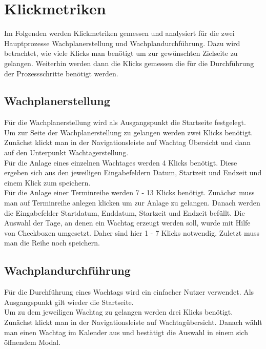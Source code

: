 \documentclass[fontsize=12pt,openright,oneside,paper=a4,BCOR=1cm]{scrbook}
\begin{document}

\section{Klickmetriken}
Im Folgenden werden Klickmetriken gemessen und analysiert für die zwei Hauptprozesse Wachplanerstellung und Wachplandurchführung. Dazu wird betrachtet, wie viele Klicks man benötigt um zur gewünschten Zielseite zu gelangen. Weiterhin werden dann die Klicks gemessen die für die Durchführung der Prozessschritte benötigt werden.

\subsection{Wachplanerstellung}
Für die Wachplanerstellung wird als Ausgangspunkt die Startseite festgelegt. \\
Um zur Seite der Wachplanerstellung zu gelangen werden zwei Klicks benötigt. Zunächst klickt man in der Navigationsleiste auf \glqq Wachtag Übersicht\grqq{} und dann auf den Unterpunkt \glqq Wachtagerstellung\grqq{}. \\
Für die Anlage eines einzelnen Wachtages werden 4 Klicks benötigt. Diese ergeben sich aus den jeweiligen Eingabefeldern \glqq Datum\grqq{}, \glqq Startzeit\grqq{} und \glqq Endzeit\grqq{} und einem Klick zum speichern. \\
Für die Anlage einer Terminreihe werden 7 - 13 Klicks benötigt. Zunächst muss man auf \glqq Terminreihe anlegen\grqq{} klicken um zur Anlage zu gelangen. Danach werden die Eingabefelder \glqq Startdatum\grqq{}, \glqq Enddatum\grqq{}, \glqq Startzeit\grqq{} und \glqq Endzeit\grqq{} befüllt. Die Auswahl der Tage, an denen ein Wachtag erzeugt werden soll, wurde mit Hilfe von Checkboxen umgesetzt. Daher sind hier 1 - 7 Klicks notwendig. Zuletzt muss man die Reihe noch speichern. \\

\subsection{Wachplandurchführung}
Für die Durchführung eines Wachtags wird ein einfacher Nutzer verwendet. Als Ausgangspunkt gilt wieder die Startseite. \\
Um zu dem jeweiligen Wachtag zu gelangen werden drei Klicks benötigt. Zunächst klickt man in der Navigationsleiste auf \glqq Wachtagübersicht\grqq{}. Danach wählt man einen Wachtag im Kalender aus und bestätigt die Auswahl in einem sich öffnendem Modal. \\
\end{document}
